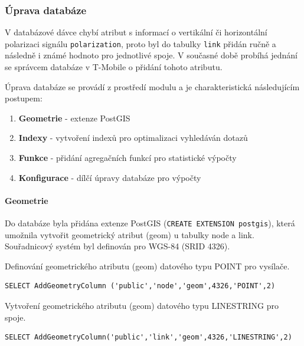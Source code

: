 \documentclass[a4paper,12pt,oneside]{report}
\begin{document}
\subsubsection*{Úprava databáze}
\label{subsubsec:upravadatabaze}  
 V databázové dávce chybí atribut s informací o vertikální či horizontální polarizaci signálu \texttt{polarization}, proto byl do tabulky \texttt{link} přidán ručně a následně i známé hodnoto pro jednotlivé spoje. V současné době probíhá jednání se správcem databáze v T-Mobile o přidání tohoto atributu.
 
Úprava databáze se provádí z prostředí modulu a je charakteristická následujícím postupem:
\begin{enumerate}
\item \textbf{Geometrie} - extenze PostGIS
\item \textbf{Indexy} - vytvoření indexů pro optimalizaci vyhledáván dotazů
\item \textbf{Funkce} - přidání agregačních funkcí pro statistické výpočty
\item \textbf{Konfigurace} - dílčí úpravy databáze pro výpočty
\end{enumerate}

\paragraph*{Geometrie} Do databáze byla přidána extenze PostGIS (\texttt{CREATE EXTENSION postgis}), která umožnila vytvořit geometrický atribut (geom) u tabulky node a link. Souřadnicový systém byl definován pro WGS-84 (SRID 4326).

Definování geometrického atributu (geom) datového typu POINT pro vysílače. 

\begin{footnotesize}
\begin{lstlisting}[style=mybash]
SELECT AddGeometryColumn ('public','node','geom',4326,'POINT',2)
\end{lstlisting}
\end{footnotesize}

Vytvoření geometrického atributu (geom) datového typu LINESTRING pro spoje. 

\begin{footnotesize}
\begin{lstlisting}[style=mybash]
SELECT AddGeometryColumn('public','link','geom',4326,'LINESTRING',2)
\end{lstlisting}
\end{footnotesize}
\end{document}
